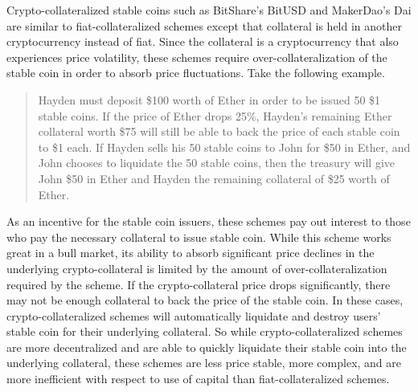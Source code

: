 Crypto-collateralized stable coins such as BitShare's BitUSD \cite{BTS15} and MakerDao's Dai \cite{MDao17} are similar to fiat-collateralized schemes except that collateral is held in another cryptocurrency instead of fiat. Since the collateral is a cryptocurrency that also experiences price volatility, these schemes require over-collateralization of the stable coin in order to absorb price fluctuations. Take the following example.
%
\begin{quote}
Hayden must deposit \$100 worth of Ether in order to be issued 50 \$1 stable coins. If the price of Ether drops 25\%, Hayden's remaining Ether collateral worth \$75 will still be able to back the price of each stable coin to \$1 each. If Hayden sells his 50 stable coins to John for \$50 in Ether, and John chooses to liquidate the 50 stable coins, then the treasury will give John \$50 in Ether and Hayden the remaining collateral of \$25 worth of Ether.
\end{quote}
%
As an incentive for the stable coin issuers, these schemes pay out interest to those who pay the necessary collateral to issue stable coin. While this scheme works great in a bull market, its ability to absorb significant price declines in the underlying crypto-collateral is limited by the amount of over-collateralization required by the scheme. If the crypto-collateral price drops significantly, there may not be enough collateral to back the price of the stable coin. In these cases, crypto-collateralized schemes will automatically liquidate and destroy users' stable coin for their underlying collateral. So while crypto-collateralized schemes are more decentralized and are able to quickly liquidate their stable coin into the underlying collateral, these schemes are less price stable, more complex, and are more inefficient with respect to use of capital than fiat-collateralized schemes. 

